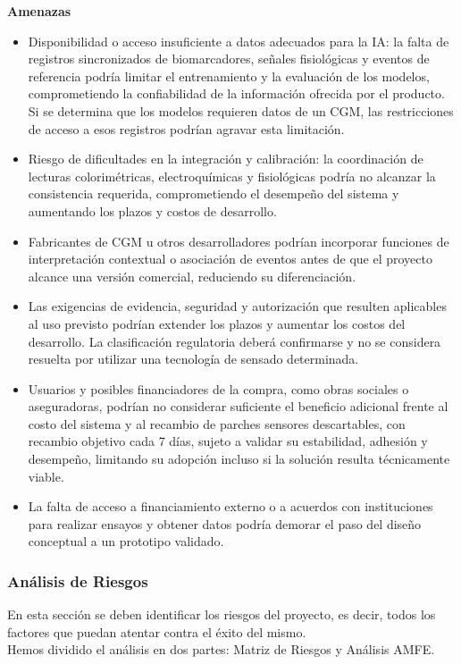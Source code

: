 \noindent\textbf{Amenazas}
\begin{itemize}
    \item Disponibilidad o acceso insuficiente a datos adecuados para la IA: la falta de registros sincronizados de biomarcadores, señales fisiológicas y eventos de referencia podría limitar el entrenamiento y la evaluación de los modelos, comprometiendo la confiabilidad de la información ofrecida por el producto. Si se determina que los modelos requieren datos de un CGM, las restricciones de acceso a esos registros podrían agravar esta limitación.
    \item Riesgo de dificultades en la integración y calibración: la coordinación de lecturas colorimétricas, electroquímicas y fisiológicas podría no alcanzar la consistencia requerida, comprometiendo el desempeño del sistema y aumentando los plazos y costos de desarrollo.
    \item Fabricantes de CGM u otros desarrolladores podrían incorporar funciones de interpretación contextual o asociación de eventos antes de que el proyecto alcance una versión comercial, reduciendo su diferenciación.
    \item Las exigencias de evidencia, seguridad y autorización que resulten aplicables al uso previsto podrían extender los plazos y aumentar los costos del desarrollo. La clasificación regulatoria deberá confirmarse y no se considera resuelta por utilizar una tecnología de sensado determinada.
    \item Usuarios y posibles financiadores de la compra, como obras sociales o aseguradoras, podrían no considerar suficiente el beneficio adicional frente al costo del sistema y al recambio de parches sensores descartables, con recambio objetivo cada 7 días, sujeto a validar su estabilidad, adhesión y desempeño, limitando su adopción incluso si la solución resulta técnicamente viable.
    \item La falta de acceso a financiamiento externo o a acuerdos con instituciones para realizar ensayos y obtener datos podría demorar el paso del diseño conceptual a un prototipo validado.
\end{itemize}

\newpage


\subsubsection{Análisis de Riesgos}
{\consigna
En esta sección se deben identificar los riesgos del proyecto, es decir, todos los factores que puedan atentar contra el éxito del mismo.\\
Hemos dividido el análisis en dos partes: Matriz de Riesgos y Análisis AMFE.
}

